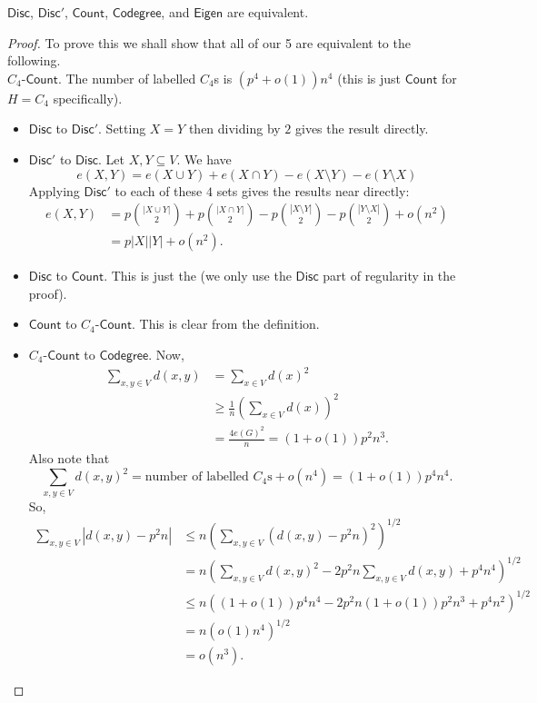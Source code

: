 			\begin{ftheo}
				$\mathsf{Disc}$, $\mathsf{Disc}'$, $\mathsf{Count}$, $\mathsf{Codegree}$, and $\mathsf{Eigen}$ are equivalent.
			\end{ftheo}
			\begin{proof}
				To prove this we shall show that all of our 5 are equivalent to the following.\\
				$C_4$-$\mathsf{Count}$. The number of labelled $C_4$s is $(p^4+o(1))n^4$ (this is just $\mathsf{Count}$ for $H = C_4$ specifically).\\
				\begin{itemize}
					\item $\mathsf{Disc}$ to $\mathsf{Disc}'$. Setting $X=Y$ then dividing by $2$ gives the result directly.
					
					\item $\mathsf{Disc}'$ to $\mathsf{Disc}$. Let $X,Y\subseteq V$. We have
					\[ e(X,Y) = e(X \cup Y) + e(X\cap Y) - e(X\setminus Y) - e(Y\setminus X) \]
					Applying $\mathsf{Disc}'$ to each of these $4$ sets gives the results near directly:
					\begin{align*}
						e(X,Y) &= p\binom{|X\cup Y|}{2} + p\binom{|X\cap Y|}{2} - p\binom{|X\setminus Y|}{2} - p\binom{|Y\setminus X|}{2} + o(n^2) \\
						&= p|X||Y| + o(n^2).
					\end{align*}
					
					\item $\mathsf{Disc}$ to $\mathsf{Count}$. This is just the  (we only use the $\mathsf{Disc}$ part of regularity in the proof).

					\item $\mathsf{Count}$ to $C_4$-$\mathsf{Count}$. This is clear from the definition.

					\item $C_4$-$\mathsf{Count}$ to $\mathsf{Codegree}$. Now,
					\begin{align*}
						\sum_{x,y\in V} d(x,y) &= \sum_{x\in V} d(x)^2 \\
							&\ge \frac{1}{n} \left(\sum_{x\in V} d(x)\right)^2 \\
							&= \frac{4e(G)^2}{n} = (1+o(1))p^2n^3.
					\end{align*}
					Also note that
					\[ \sum_{x,y\in V} d(x,y)^2 = \text{number of labelled $C_4$s} + o(n^4) = (1+o(1)) p^4 n^4. \]
					So,
					\begin{align*}
						\sum_{x,y\in V} |d(x,y) - p^2 n| &\le n \left( \sum_{x,y\in V} (d(x,y) - p^2n)^2 \right)^{1/2} \\
							&= n \left( \sum_{x,y\in V} d(x,y)^2 - 2 p^2n \sum_{x,y\in V} d(x,y) + p^4 n^4 \right)^{1/2} \\
							&\le n\left( (1+o(1))p^4n^4 - 2p^2n (1+o(1))p^2n^3 + p^4n^2 \right)^{1/2} \\
							&= n (o(1)n^4)^{1/2} \\
							&= o(n^3).
					\end{align*}


\end{itemize}
\end{proof}
